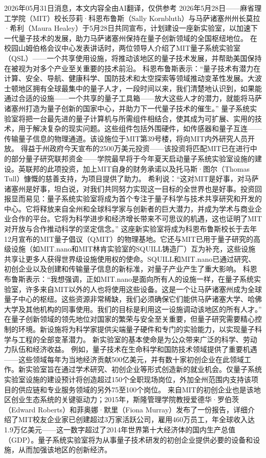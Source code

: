 \documentclass[12pt,a4paper]{ctexart}
\begin{document}
2026年05月31日消息，本文内容全由AI翻译，仅供参考
2026年5月28日——麻省理工学院（MIT）校长莎莉·科恩布鲁斯（Sally Kornbluth）与马萨诸塞州州长莫拉·希利（Maura Healey）于5月28日共同宣布，计划建设一座新实验室，以加速下一代量子技术的发展，助力马萨诸塞州保持在量子创新领域的全国枢纽地位。
在校园山姆伯格会议中心发表讲话时，两位领导人介绍了MIT量子系统实验室（QSL）——一个共享使用设施，将推动该地区的量子技术发展，并帮助美国保持在被视为对多个产业至关重要的技术前沿。
科恩布鲁斯表示：“量子技术有潜力在计算、安全、导航、健康科学、国防技术和太空探索等领域推动变革性发展。大波士顿地区拥有全球最集中的量子人才，一段时间以来，我们清楚地认识到，如果能通过合适的设施——一个共享的量子工具箱——放大这些人才的潜力，就能将马萨诸塞州打造为量子创新的国家中心，并助力下一代量子技术的催生。”
量子系统实验室将把一台最先进的量子计算机与所需组件相结合，使其成为可扩展、实用的技术，用于解决复杂的现实问题。这些组件包括外围硬件，如传感器和量子互连——传输量子信息的物理通道。该设施位于MIT第39号楼，将向MIT内外研究人员开放。
得益于州政府今天宣布的2500万美元投资——该投资将匹配MIT已在进行中的部分量子研究联邦资金——学院最早将于今年夏天启动量子系统实验室设施的建设。英联邦的此项投资，加上MIT自身的财务承诺以及托马斯·图尔（Thomas Tull）慷慨的慈善支持，为项目提供了助力。
希利说：“这对MIT是好事，对马萨诸塞州是好事，坦白说，对我们共同努力实现这一目标的全世界也是好事。投资回报显而易见：量子系统实验室将成为首个专注于量子科学与技术共享研究和开发的中心。它将释放来自全州和全球科学家与创新者的巨大潜力，并成为学术与商业企业合作的平台。它将为科学进步和经济增长带来不可思议的机遇，这也证明了MIT对开放与合作推动科学的坚定信念。”
这座新实验室将成为科恩布鲁斯校长于去年12月宣布的MIT量子倡议（QMIT）的物理基地。它还与MIT已用于量子研究的高级设施（如MIT.nano和MIT林肯实验室的SQUILL铸造厂）互为补充，这些设施共享让更多人获得世界级设施使用权的使命。SQUILL和MIT.nano已通过研究、初创企业以及创建和传输量子信息的新标准，对量子产业产生了重大影响。
科恩布鲁斯表示：“我想强调，正如MIT.nano是面向所有人的设施一样，在量子系统实验室，许多来自MIT以外的人也将使用这些设备。这是一个让马萨诸塞州成为全球量子中心的枢纽。这些资源非常稀缺，我们必须确保它们能供马萨诸塞大学、哈佛大学及其他机构的同事使用。我们的目标是利用这一设施调动该地区的所有人才。”
在量子创新领域的领先地位对国家的繁荣与安全至关重要，但量子研究需要精心控制的环境。新设施将为科学家提供尖端量子硬件和专门的实验能力，以实现量子科学与工程的全部变革潜力。
新实验室的基本使命是为公众带来广泛的科学、劳动力队伍和经济收益。
例如，量子技术在生命科学和国防技术领域提供了重要机遇——这些领域每年为当地经济贡献500亿美元，并有数十家初创企业在此领域工作。新实验室旨在通过学术研究、初创企业等形式创造新的就业机会。仅量子系统实验室设施的建设预计将创造超过150个全职现场岗位，外加全州范围内支持该项目的供应链和专业服务领域的另外75至100个岗位。
来自MIT的初创企业也是该地区创业生态系统的关键驱动力；2015年，斯隆管理学院教授爱德华·罗伯茨（Edward Roberts）和菲奥娜·默里（Fiona Murray）发布了一份报告，详细介绍了MIT校友企业家已创建超过3万家活跃公司，雇用460万员工，年全球收入达1.9万亿美元——这一数字超过了2014年世界第十大经济体的国内生产总值（GDP）。量子系统实验室将为从事量子技术研发的初创企业提供必要的设备和设施，从而加强该地区的创新经济。
\end{document}
